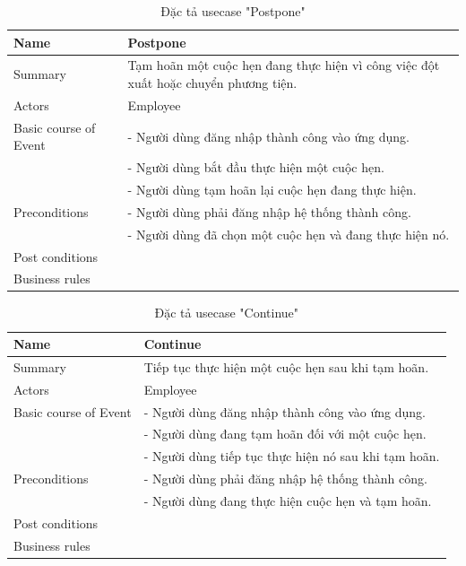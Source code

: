 \documentclass[a4paper]{article}
\begin{document}
\begin{table}[!h]
    \centering
    \begin{tabular}{|m{3.2cm}|m{10.5cm}|}
        \hline
        Name & Postpone\\
        \hline
        Summary & Tạm hoãn một cuộc hẹn đang thực hiện vì công việc đột xuất hoặc chuyển phương tiện.\\
        \hline
        Actors & Employee\\
        \hline
        Basic course of Event & -	Người dùng đăng nhập thành công vào ứng dụng.\\
&-	Người dùng bắt đầu thực hiện một cuộc hẹn.\\
&-	Người dùng tạm hoãn lại cuộc hẹn đang thực hiện.\\
        \hline
        Preconditions &-	Người dùng  phải đăng nhập hệ thống thành công.\\
&-	Người dùng đã chọn một cuộc hẹn và đang thực hiện nó.\\
        \hline
        Post conditions &\\
        \hline
        Business rules & \\
        \hline
    \end{tabular}
    \caption{Đặc tả usecase "Postpone"}
\end{table}
\begin{table}[!h]
    \centering
    \begin{tabular}{|m{3.2cm}|m{10.5cm}|}
        \hline
        Name & Continue\\
        \hline
        Summary & Tiếp tục thực hiện một cuộc hẹn sau khi tạm hoãn.\\
        \hline
        Actors & Employee\\
        \hline
        Basic course of Event & -	Người dùng đăng nhập thành công vào ứng dụng.\\
&-	Người dùng đang tạm hoãn đối với một cuộc hẹn.\\
&-	Người dùng tiếp tục thực hiện nó sau khi tạm hoãn.\\
        \hline
        Preconditions & -	Người dùng  phải đăng nhập hệ thống thành công.\\
&-	Người dùng đang thực hiện cuộc hẹn và tạm hoãn.\\
        \hline
        Post conditions & \\
        \hline
        Business rules & \\
        \hline
    \end{tabular}
    \caption{Đặc tả usecase "Continue"}
\end{table}
\end{document}
